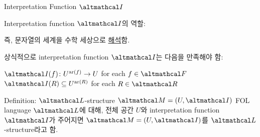 \documentclass[../231120_msquare_computational-logic.tex]{subfiles}
\begin{document}
\begin{frame}{Interpretation Function \(\mcal I\)}

    Interpretation function \(\mcal I\)의 역할:
    \begin{center}
    \end{center}
    즉, 문자열의 세계을 수학 세상으로 \ul{해석}함. \pause
    
    \vspace*{1em}

    상식적으로 interpretation function \(\mcal I\)는 다음을 만족해야 함:
    \begin{itemize}
        \ii \(\mcal I(f) \colon U^{\mrm{ar}(f)} \to U\) \hfill for each \(f \in \mcal F\)
        \ii \(\mcal I(R) \subseteq U^{\mrm{ar}(R)}\) \hfill for each \(R \in \mcal R\)
    \end{itemize}
    \pause

    \begin{block}{Definition: \(\mcal L\)-structure \(\mcal M = (U, \mcal I)\)}
        FOL language \(\mcal L\)에 대해,
        전체 공간 \(U\)와 interpretation function \(\mcal I\)가 주어지면
        \(\mcal M = (U, \mcal I)\)를 \alert{\(\mcal L\)-structure}라고 함.
    \end{block}
\end{frame}
\end{document}

